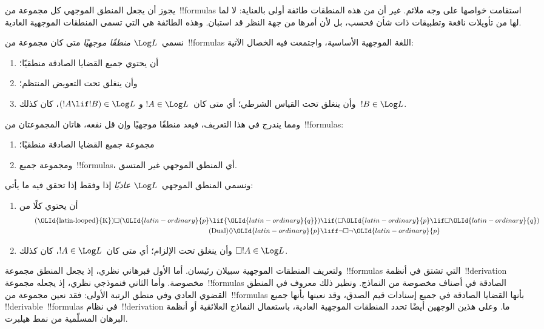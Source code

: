 \documentclass[../../../include/open-logic-section]{subfiles}
\begin{document}


يجوز أن يجعل المنطق الموجهي كل مجموعة من~!!{formula}s استقامت خواصها
على وجه ملائم. غير أن من هذه المنطقات طائفة أولى بالعناية: لا لما لها
من تأويلات نافعة وتطبيقات ذات شأن فحسب، بل لأن أمرها من جهة النظر قد
استبان. وهذه الطائفة هي التي تسمى المنطقات الموجهية العادية.

\begin{defn}
نسمي~$\Log L$ \emph{منطقًا موجهيًا} متى كان مجموعة من~!!{formula}s
اللغة الموجهية الأساسية، واجتمعت فيه الخصال الآتية:
\begin{enumerate}
\item أن يحتوي جميع القضايا الصادقة منطقيًا؛
\item وأن ينغلق تحت التعويض المنتظم؛
\item وأن ينغلق تحت القياس الشرطي؛ أي متى كان~$!A \in \Log L$ و
  $(!A \lif !B) \in \Log L$، كان كذلك~$!B \in \Log L$.
\end{enumerate}
\end{defn}

\begin{ex}
ومما يندرج في هذا التعريف، فيعد منطقًا موجهيًا وإن قل نفعه، هاتان
المجموعتان من~!!{formula}s:
\begin{enumerate}
\item مجموعة جميع القضايا الصادقة منطقيًا؛
\item ومجموعة جميع~!!{formula}s، أي المنطق الموجهي غير المتسق.
\end{enumerate}
\end{ex}

\begin{defn}
ونسمي المنطق الموجهي~$\Log L$ \emph{عاديًا} إذا وفقط إذا تحقق فيه ما يأتي:
\begin{enumerate}
\item أن يحتوي كلًا من
\begin{align}
\tag{{\OLId{latin-looped}{K}}} \Box({\OLId{latin-ordinary}{p}} \lif {\OLId{latin-ordinary}{q}}) & \lif (\Box {\OLId{latin-ordinary}{p}} \lif \Box {\OLId{latin-ordinary}{q}}) \\
\tag{Dual} \Diamond {\OLId{latin-ordinary}{p}} & \liff \lnot \Box \lnot {\OLId{latin-ordinary}{p}}
\end{align}
\item وأن ينغلق تحت الإلزام؛ أي متى كان~$!A \in \Log L$، كان كذلك
  $\Box !A \in \Log L$.
\end{enumerate}
\end{defn}

ولتعريف المنطقات الموجهية سبيلان رئيسان. أما الأول فبرهاني نظري، إذ
يجعل المنطق مجموعة~!!{formula}s التي تشتق في أنظمة~!!{derivation}
مخصوصة. وأما الثاني فنموذجي نظري، إذ يجعله مجموعة~!!{formula}s الصادقة
في أصناف مخصوصة من النماذج. ونظير ذلك معروف في المنطق القضوي العادي وفي
منطق الرتبة الأولى: فقد نعين مجموعة من~!!{formula}s بأنها القضايا
الصادقة في جميع إسنادات قيم الصدق، وقد نعينها بأنها جميع
!!{derivable}~!!{formula}s في نظام~!!{derivation} ما. وعلى هذين
الوجهين أيضًا تحدد المنطقات الموجهية العادية، باستعمال النماذج
العلائقية أو أنظمة البرهان المسلّمية من نمط هيلبرت.
\end{document}
